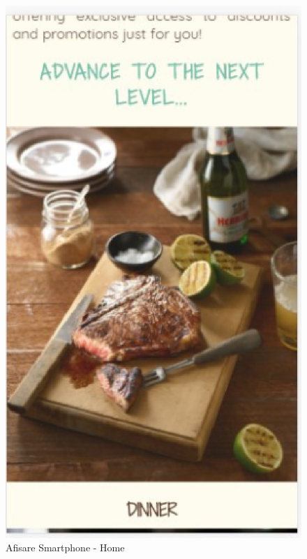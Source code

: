 \documentclass[11pt]{article}
\begin{document}
\begin{figure}[h]
\includegraphics{images/72.eps}
\caption{Afisare Smartphone - Home}
\end{figure}
\end{document}
